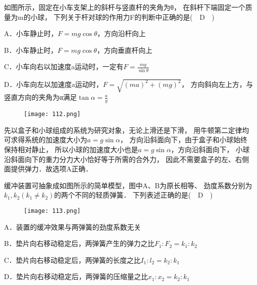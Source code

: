 \documentclass[cn,11pt]{elegantbook}
\begin{document}
   \newpage

   \begin{example}
      如图所示，固定在小车支架上的斜杆与竖直杆的夹角为θ，
      在斜杆下端固定一个质量为m的小球，
      下列关于杆对球的作用力F的判断中正确的是(　D　)    
      
      A．小车静止时，$F=m g \cos \theta$，方向沿杆向上
      
      B．小车静止时，$F=m g \cos \theta$，方向垂直杆向上

      C．小车向右以加速度a运动时，一定有$F=\frac{m g}{\sin \theta}$

      D．小车向左以加速度a运动时，$F=\sqrt{(m a)^{2}+(m g)^{2}}$，
      方向斜向左上方，与竖直方向的夹角为α满足$\tan \alpha=\frac{a}{g}$

      \begin{figure}[htbp]
         \centering
         \texttt{[image: 112.png]}
      \end{figure}
   
      \begin{solution}
         先以盒子和小球组成的系统为研究对象，无论上滑还是下滑，
         用牛顿第二定律均可求得系统的加速度大小为$a=g \sin \alpha$，
         方向沿斜面向下，由于盒子和小球始终保持相对静止，
         所以小球的加速度大小也是$a=g \sin \alpha$，方向沿斜面向下，
         小球沿斜面向下的重力分力大小恰好等于所需的合外力，
         因此不需要盒子的左、右侧面提供弹力．故选项A正确．               
      \end{solution}   
      
   \end{example}

   \begin{example}
      缓冲装置可抽象成如图所示的简单模型，图中A、B为原长相等、
      劲度系数分别为$k_{1}, k_{2}\left(k_{1} \neq k_{2}\right)$的两个不同的轻质弹簧．
      下列表述正确的是(　D　)
      \begin{figure}[htbp]
         \centering
         \texttt{[image: 113.png]}
      \end{figure}
   
      A．装置的缓冲效果与两弹簧的劲度系数无关

      B．垫片向右移动稳定后，两弹簧产生的弹力之比$F_{1} : F_{2}=k_{1} : k_{2}$　

      C．垫片向右移动稳定后，两弹簧的长度之比$I_{1} : l_{2}=k_{2} : k_{1}$

      D．垫片向右移动稳定后，两弹簧的压缩量之比$x_{1} : x_{2}=k_{2} : k_{1}$　

      
   \end{example}
\end{document}
